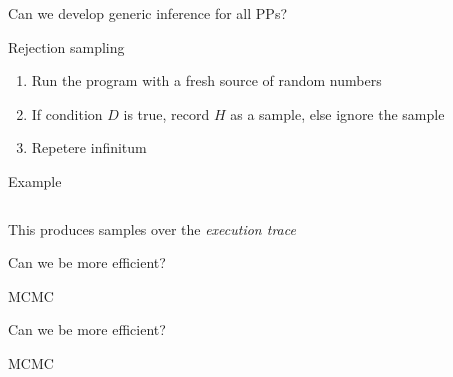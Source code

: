 \begin{frame}{Can we develop generic inference for all PPs?}
  \begin{block}{Rejection sampling}
    \begin{enumerate}
      \item Run the program with a fresh source of random numbers
      \item If condition $D$ is true, record $H$ as a sample, else ignore the sample
      \item Repetere infinitum
    \end{enumerate}
  \end{block}
  \begin{block}{Example}
    \begin{columns}
      \begin{column}{.4\textwidth}
        
      \end{column}
      \begin{column}{.4\textwidth}
        
      \end{column}
    \end{columns}
  \end{block}
  \begin{block}{This produces samples over the \emph{execution trace}}
    \eg 
  \end{block}
\end{frame}

\begin{frame}{Can we be more efficient?}
  \begin{block}{MCMC}
    
  \end{block}
\end{frame}

\begin{frame}{Can we be more efficient?}
  \begin{block}{MCMC}
    
  \end{block}
\end{frame}

